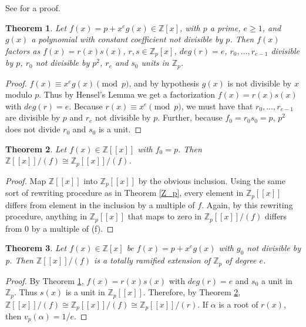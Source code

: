\documentclass{article}
\newtheorem{theorem}{Theorem}
\begin{document}
See \cite{MR1697859} for a proof.

\begin{theorem} \label{factor}
Let $f(x) = p + x^e g(x) \in \mathbb{Z}[x]$, with $p$ a prime, $e \ge 1$, and $g(x)$ a polynomial with constant coefficient not divisible by $p$.  Then $f(x)$ factors as $f(x) = r(x)s(x)$, $r,s \in \mathbb{Z}_p[x]$, $deg(r) = e$, $r_0, \ldots, r_{e-1}$ divisible by $p$, $r_0$ not divisible by $p^2$, $r_e$ and $s_0$ units in $\mathbb{Z}_p$.
\end{theorem}

\begin{proof}
$f(x) \equiv x^e g(x) \pmod{p}$, and by hypothesis $g(x)$ is not divisible by $x$ modulo $p$.  Thus by Hensel's Lemma we get a factorization $f(x) = r(x)s(x)$ with $deg(r) = e$.  Because $r(x) \equiv x^e \pmod{p}$, we must have that $r_0, \ldots, r_{e-1}$ are divisible by $p$ and $r_e$ not divisible by $p$.  Further, because $f_0 = r_0 s_0 = p$, $p^2$ does not divide $r_0$ and $s_0$ is a unit.
\end{proof}

\begin{theorem}\label{expand}
Let $f(x) \in \mathbb{Z}[[x]]$ with $f_0 = p$.  Then $\mathbb{Z}[[x]]/(f) \cong \mathbb{Z}_p[[x]]/(f)$.
\end{theorem}

\begin{proof}
Map $\mathbb{Z}[[x]]$ into $\mathbb{Z}_p[[x]]$ by the obvious inclusion.  Using the same sort of rewriting procedure as in Theorem \ref{Z_p}, every element in $\mathbb{Z}_p[[x]]$ differs from element in the inclusion by a multiple of $f$.  Again, by this rewriting procedure, anything in $\mathbb{Z}_p[[x]]$ that maps to zero in $\mathbb{Z}_p[[x]]/(f)$ differs from 0 by a multiple of (f).
\end{proof}

\begin{theorem}
Let $f(x) \in \mathbb{Z}[x]$ be $f(x) = p + x^e g(x)$ with $g_0$ not divisible by p.  Then $\mathbb{Z}[[x]]/(f)$ is a totally ramified extension of $\mathbb{Z}_p$ of degree $e$.
\end{theorem}

\begin{proof}
By Theorem \ref{factor}, $f(x) = r(x)s(x)$ with $deg(r) = e$ and $s_0$ a unit in $\mathbb{Z}_p$.  Thus $s(x)$ is a unit in $\mathbb{Z}_p[[x]]$.  Therefore, by Theorem \ref{expand}, $\mathbb{Z}[[x]]/(f) \cong \mathbb{Z}_p[[x]]/(f) \cong \mathbb{Z}_p[[x]]/(r)$.  If $\alpha$ is a root of $r(x)$, then $v_p(\alpha) = 1/e$.
\end{proof}



\end{document}

